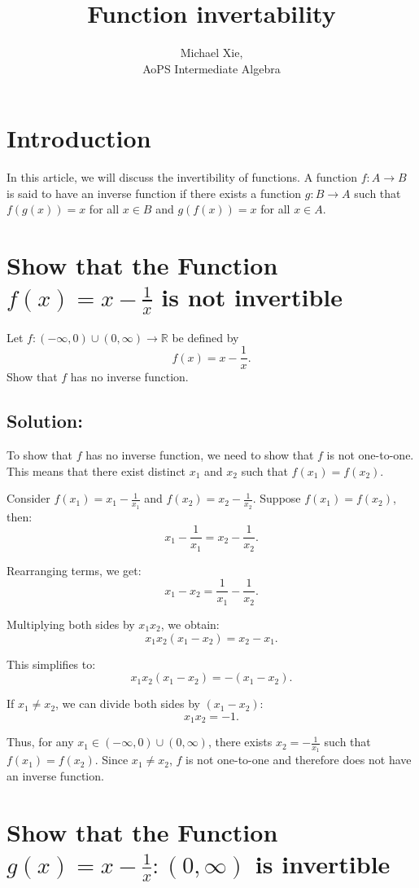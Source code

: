 \documentclass{article}
\title{Function invertability}
\author{Michael Xie, \\ AoPS Intermediate Algebra}
\begin{document}
\maketitle

\section{Introduction}
In this article, we will discuss the invertibility of functions. A function $f : A \to B$ is said to have an inverse function if there exists a function $g : B \to A$ such that $f(g(x)) = x$ for all $x \in B$ and $g(f(x)) = x$ for all $x \in A$.

\section{Show that the Function $f(x) = x-\frac{1}{x}$ is not invertible}

Let $f : (-\infty,0) \cup (0,\infty) \to \mathbb{R}$ be defined by
\[ f(x) = x - \frac{1}{x}. \]
Show that $f$ has no inverse function.

\subsection*{Solution:}

To show that $f$ has no inverse function, we need to show that $f$ is not one-to-one. This means that there exist distinct $x_1$ and $x_2$ such that $f(x_1) = f(x_2)$.

Consider $f(x_1) = x_1 - \frac{1}{x_1}$ and $f(x_2) = x_2 - \frac{1}{x_2}$. Suppose $f(x_1) = f(x_2)$, then:
\[ x_1 - \frac{1}{x_1} = x_2 - \frac{1}{x_2}. \]

Rearranging terms, we get:
\[ x_1 - x_2 = \frac{1}{x_1} - \frac{1}{x_2}. \]

Multiplying both sides by $x_1 x_2$, we obtain:
\[ x_1 x_2 (x_1 - x_2) = x_2 - x_1. \]

This simplifies to:
\[ x_1 x_2 (x_1 - x_2) = -(x_1 - x_2). \]

If $x_1 \neq x_2$, we can divide both sides by $(x_1 - x_2)$:
\[ x_1 x_2 = -1. \]

Thus, for any $x_1 \in (-\infty,0) \cup (0,\infty)$, there exists $x_2 = -\frac{1}{x_1}$ such that $f(x_1) = f(x_2)$. Since $x_1 \neq x_2$, $f$ is not one-to-one and therefore does not have an inverse function.

\section{Show that the Function $g(x) = x-\frac{1}{x} : (0, \infty)$ is invertible}
\end{document}
